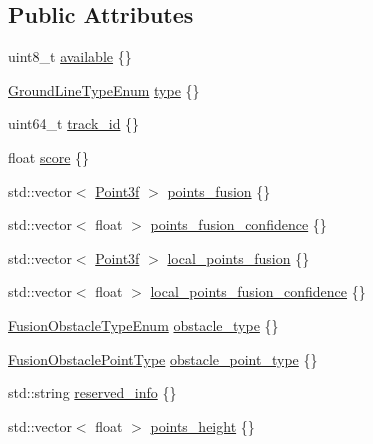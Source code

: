\subsection*{Public Attributes}
\begin{DoxyCompactItemize}
\item 
uint8\+\_\+t \hyperlink{structmaf__perception__interface_1_1FusionGroundLineData_ade59ee2b94966426a248ddc4d01f60dc}{available} \{\}
\item 
\hyperlink{structmaf__perception__interface_1_1GroundLineTypeEnum}{Ground\+Line\+Type\+Enum} \hyperlink{structmaf__perception__interface_1_1FusionGroundLineData_a7f0c77e940a727d2acae77493c74b7a9}{type} \{\}
\item 
uint64\+\_\+t \hyperlink{structmaf__perception__interface_1_1FusionGroundLineData_ab13ea178b479b3f4f50c376cd33fe9ba}{track\+\_\+id} \{\}
\item 
float \hyperlink{structmaf__perception__interface_1_1FusionGroundLineData_a2b65c4de72259e96a96bbd97ffdd52ee}{score} \{\}
\item 
std\+::vector$<$ \hyperlink{structmaf__perception__interface_1_1Point3f}{Point3f} $>$ \hyperlink{structmaf__perception__interface_1_1FusionGroundLineData_acb95d16c931fe64a49b33e13f51aca1a}{points\+\_\+fusion} \{\}
\item 
std\+::vector$<$ float $>$ \hyperlink{structmaf__perception__interface_1_1FusionGroundLineData_a85b2ec2d9981facafbda4649b5e69a98}{points\+\_\+fusion\+\_\+confidence} \{\}
\item 
std\+::vector$<$ \hyperlink{structmaf__perception__interface_1_1Point3f}{Point3f} $>$ \hyperlink{structmaf__perception__interface_1_1FusionGroundLineData_a33ee956782c80a8cc13983320212f7c6}{local\+\_\+points\+\_\+fusion} \{\}
\item 
std\+::vector$<$ float $>$ \hyperlink{structmaf__perception__interface_1_1FusionGroundLineData_a71786b1d175a4931665e1e429a8e446d}{local\+\_\+points\+\_\+fusion\+\_\+confidence} \{\}
\item 
\hyperlink{structmaf__perception__interface_1_1FusionObstacleTypeEnum}{Fusion\+Obstacle\+Type\+Enum} \hyperlink{structmaf__perception__interface_1_1FusionGroundLineData_a89dccbd2a1633e9c80f293fbd7a4555a}{obstacle\+\_\+type} \{\}
\item 
\hyperlink{structmaf__perception__interface_1_1FusionObstaclePointType}{Fusion\+Obstacle\+Point\+Type} \hyperlink{structmaf__perception__interface_1_1FusionGroundLineData_a1b8ac58a30855e8502c0d797470e3e3b}{obstacle\+\_\+point\+\_\+type} \{\}
\item 
std\+::string \hyperlink{structmaf__perception__interface_1_1FusionGroundLineData_a23bedaa76aa9d836009ebcb0cd2a2003}{reserved\+\_\+info} \{\}
\item 
std\+::vector$<$ float $>$ \hyperlink{structmaf__perception__interface_1_1FusionGroundLineData_aad0ec304409b71b0e779a3668573674a}{points\+\_\+height} \{\}
\end{DoxyCompactItemize}


